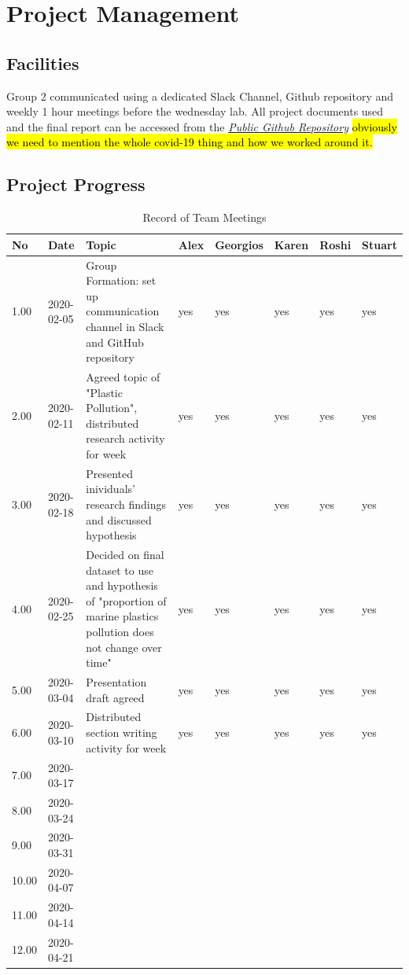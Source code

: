 \documentclass[10pt]{article}\usepackage[]{graphicx}\usepackage[]{color}
\begin{document}




\pagebreak
\section{Project Management}\label{mgt}
\subsection{Facilities}
Group 2 communicated using a dedicated Slack Channel, Github repository and weekly 1 hour meetings before the wednesday lab.
All project documents used and the final report can be accessed from the \textit{\href{https://github.com/KarenJewell/CMM507Group2}{Public Github Repository}}
\hl{obviously we need to mention the whole covid-19 thing and how we worked around it.}

\subsection{Project Progress}

\begin{table}[ht]
\centering
\caption{Record of Team Meetings} 
\label{tab:one}
\begin{tabular}{llp{8cm}lllll}
  \hline
No & Date & Topic & Alex & Georgios & Karen & Roshi & Stuart \\ 
  \hline
1.00 & 2020-02-05 & Group Formation: set up communication channel in Slack and GitHub repository & yes & yes & yes & yes & yes \\ 
  2.00 & 2020-02-11 & Agreed topic of "Plastic Pollution", distributed research activity for week & yes & yes & yes & yes & yes \\ 
  3.00 & 2020-02-18 & Presented inividuals' research findings and discussed hypothesis & yes & yes & yes & yes & yes \\ 
  4.00 & 2020-02-25 & Decided on final dataset to use and hypothesis of "proportion of marine plastics pollution does not change over time" & yes & yes & yes & yes & yes \\ 
  5.00 & 2020-03-04 & Presentation draft agreed & yes & yes & yes & yes & yes \\ 
  6.00 & 2020-03-10 & Distributed section writing activity for week & yes & yes & yes & yes & yes \\ 
  7.00 & 2020-03-17 &  &  &  &  &  &  \\ 
  8.00 & 2020-03-24 &  &  &  &  &  &  \\ 
  9.00 & 2020-03-31 &  &  &  &  &  &  \\ 
  10.00 & 2020-04-07 &  &  &  &  &  &  \\ 
  11.00 & 2020-04-14 &  &  &  &  &  &  \\ 
  12.00 & 2020-04-21 &  &  &  &  &  &  \\ 
   \hline
\end{tabular}
\end{table}
\end{document}
